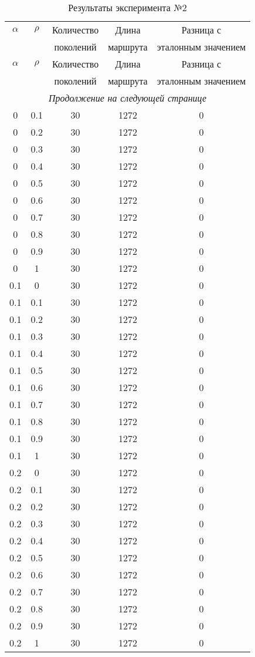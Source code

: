 \begin{longtable}{|c|c|c|c|c|}
	\caption{Результаты эксперимента №2}\label{table_2}\\
	\hline
	
	$\alpha$ & $\rho$ & Количество  & Длина & Разница с  \\
	&& поколений & маршрута & эталонным значением\\
	\hline
	\endfirsthead
	
	\hline
	$\alpha$ & $\rho$ & Количество  & Длина & Разница с  \\
	&& поколений & маршрута & эталонным значением\\
	\hline
	\endhead
	
	\hline
	\multicolumn{5}{c}{\textit{Продолжение на следующей странице}}
	\endfoot
	\hline
	\endlastfoot
	
	0& 0& 30& 1272& 0\\
	0& 0.1& 30& 1272& 0\\
	0& 0.2& 30& 1272& 0\\
	0& 0.3& 30& 1272& 0\\
	0& 0.4& 30& 1272& 0\\
	0& 0.5& 30& 1272& 0\\
	0& 0.6& 30& 1272& 0\\
	0& 0.7& 30& 1272& 0\\
	0& 0.8& 30& 1272& 0\\
	0& 0.9& 30& 1272& 0\\
	0& 1& 30& 1272& 0\\
	\hline
	
	0.1& 0& 30& 1272& 0\\
	0.1& 0.1& 30& 1272& 0\\
	0.1& 0.2& 30& 1272& 0\\
	0.1& 0.3& 30& 1272& 0\\
	0.1& 0.4& 30& 1272& 0\\
	0.1& 0.5& 30& 1272& 0\\
	0.1& 0.6& 30& 1272& 0\\
	0.1& 0.7& 30& 1272& 0\\
	0.1& 0.8& 30& 1272& 0\\
	0.1& 0.9& 30& 1272& 0\\
	0.1& 1& 30& 1272& 0\\
	\hline
	
	0.2& 0& 30& 1272& 0\\
	0.2& 0.1& 30& 1272& 0\\
	0.2& 0.2& 30& 1272& 0\\
	0.2& 0.3& 30& 1272& 0\\
	0.2& 0.4& 30& 1272& 0\\
	0.2& 0.5& 30& 1272& 0\\
	0.2& 0.6& 30& 1272& 0\\
	0.2& 0.7& 30& 1272& 0\\
	0.2& 0.8& 30& 1272& 0\\
	0.2& 0.9& 30& 1272& 0\\
	0.2& 1& 30& 1272& 0\\
	\hline
	

\end{longtable}
